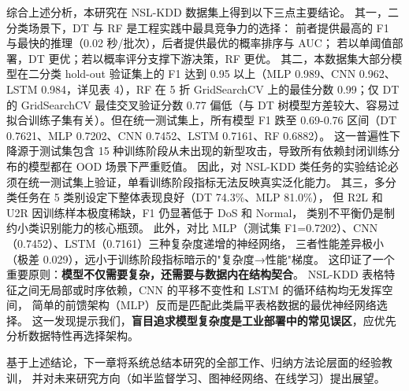 综合上述分析，本研究在 NSL-KDD 数据集上得到以下三点主要结论。
其一，二分类场景下，DT 与 RF 是工程实践中最具竞争力的选择：
前者提供最高的 F1 与最快的推理（0.02 秒/批次），后者提供最优的概率排序与 AUC；
若以单阈值部署，DT 更优；若以概率评分支撑下游决策，RF 更优。
其二，本数据集大部分模型在二分类 hold-out 验证集上的 F1 达到 0.95 以上（MLP 0.989、CNN 0.962、LSTM 0.984，详见表 4），RF 在 5 折 GridSearchCV 上的最佳分数 0.99；仅 DT 的 GridSearchCV 最佳交叉验证分数 0.77 偏低（与 DT 树模型方差较大、容易过拟合训练子集有关）。但在统一测试集上，所有模型 F1 跌至 0.69-0.76 区间（DT 0.7621、MLP 0.7202、CNN 0.7452、LSTM 0.7161、RF 0.6882）。
这一普遍性下降源于测试集包含 15 种训练阶段从未出现的新型攻击，导致所有依赖封闭训练分布的模型都在 OOD 场景下严重贬值。
因此，对 NSL-KDD 类任务的实验结论必须在统一测试集上验证，单看训练阶段指标无法反映真实泛化能力。
其三，多分类任务在 5 类别设定下整体表现良好（DT 74.3\%、MLP 81.0\%），
但 R2L 和 U2R 因训练样本极度稀缺，F1 仍显著低于 DoS 和 Normal，
类别不平衡仍是制约小类识别能力的核心瓶颈。
此外，对比 MLP（测试集 F1=0.7202）、CNN（0.7452）、LSTM（0.7161）三种复杂度递增的神经网络，
三者性能差异极小（极差 0.029），远小于训练阶段指标暗示的"复杂度→性能"梯度。
这印证了一个重要原则：\textbf{模型不仅需要复杂，还需要与数据内在结构契合}。
NSL-KDD 表格特征之间无局部或时序依赖，CNN 的平移不变性和 LSTM 的循环结构均无发挥空间，
简单的前馈架构（MLP）反而是匹配此类扁平表格数据的最优神经网络选择。
这一发现提示我们，\textbf{盲目追求模型复杂度是工业部署中的常见误区}，应优先分析数据特性再选择架构。

基于上述结论，下一章将系统总结本研究的全部工作、归纳方法论层面的经验教训，
并对未来研究方向（如半监督学习、图神经网络、在线学习）提出展望。
